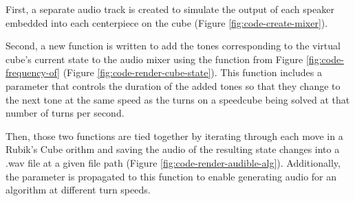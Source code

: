 First, a separate audio track is created to simulate the output of each speaker embedded into each centerpiece on the cube (Figure \ref{fig:code-create-mixer}).

Second, a new function is written to add the tones corresponding to the virtual cube's current state to the audio mixer using the  function from Figure \ref{fig:code-frequency-of} (Figure \ref{fig:code-render-cube-state}).
This function includes a  parameter that controls the duration of the added tones so that they change to the next tone at the same speed as the turns on a speedcube being solved at that number of turns per second.

Then, those two functions are tied together by iterating through each move in a Rubik's Cube orithm and saving the audio of the resulting state changes into a .wav file at a given file path (Figure \ref{fig:code-render-audible-alg}).
Additionally, the  parameter is propagated to this function to enable generating audio for an algorithm at different turn speeds.

